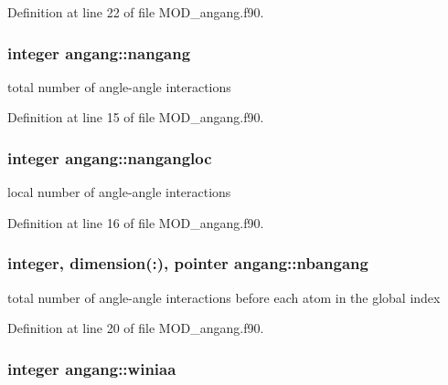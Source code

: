 Definition at line 22 of file M\-O\-D\-\_\-angang.\-f90.

\hypertarget{classangang_a27cd11fc29f7185ce70a9a7469b1c6b9}{
\subsubsection[{nangang}]{\setlength{\rightskip}{0pt plus 5cm}integer angang\-::nangang}}\label{classangang_a27cd11fc29f7185ce70a9a7469b1c6b9}


total number of angle-\/angle interactions 



Definition at line 15 of file M\-O\-D\-\_\-angang.\-f90.

\hypertarget{classangang_ad20c3e9280f1a7c396d906a6c22fb67f}{
\subsubsection[{nangangloc}]{\setlength{\rightskip}{0pt plus 5cm}integer angang\-::nangangloc}}\label{classangang_ad20c3e9280f1a7c396d906a6c22fb67f}


local number of angle-\/angle interactions 



Definition at line 16 of file M\-O\-D\-\_\-angang.\-f90.

\hypertarget{classangang_a47beef4aed0dd59a265ad0d99a3609f3}{
\subsubsection[{nbangang}]{\setlength{\rightskip}{0pt plus 5cm}integer, dimension(\-:), pointer angang\-::nbangang}}\label{classangang_a47beef4aed0dd59a265ad0d99a3609f3}


total number of angle-\/angle interactions before each atom in the global index 



Definition at line 20 of file M\-O\-D\-\_\-angang.\-f90.

\hypertarget{classangang_a211febc22214b0a0c02c93efc63ac2aa}{
\subsubsection[{winiaa}]{\setlength{\rightskip}{0pt plus 5cm}integer angang\-::winiaa}}\label{classangang_a211febc22214b0a0c02c93efc63ac2aa}


